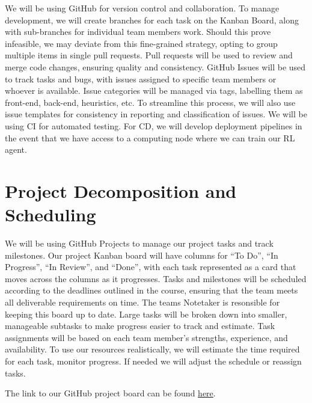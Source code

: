 \documentclass{article}
\begin{document}
\raggedright
We will be using GitHub for version control and collaboration.
To manage development, we will create branches for each task on the Kanban Board,
along with sub-branches for individual team members work.
Should this prove infeasible, we may deviate from this fine-grained strategy, opting to group multiple items in single pull requests.
Pull requests will be used to review and merge code changes, ensuring quality and
consistency. GitHub Issues will be used to track tasks and bugs, with 
issues assigned to specific team members or whoever is available.
Issue categories will be managed via tags, labelling them as front-end, back-end, heuristics, etc.
To streamline this process, we will also use issue templates for 
consistency in reporting and classification of issues.  We will be
using CI for automated testing. For CD, we will develop deployment pipelines in the
event that we have access to a computing node where we can train our RL agent.

\section{Project Decomposition and Scheduling}


\raggedright
We will be using GitHub Projects to manage our project tasks and 
track milestones. Our project Kanban board will have columns for ``To Do'', ``In Progress'', ``In Review'',
and ``Done'', with each task represented as a card that moves across the columns as it progresses. Tasks
and milestones will be scheduled according to the deadlines outlined in the course, ensuring that
the team meets all deliverable requirements on time. The teams Notetaker is resonsible for keeping
this board up to date. Large tasks will be broken down into smaller,
manageable subtasks to make progress easier to track and estimate. Task assignments will be based
on each team member’s strengths, experience, and availability. To use our resources realistically,
we will estimate the time required for each task, monitor progress. If needed we will adjust the
schedule or reassign tasks.

\medskip
The link to our GitHub project board can be found \href{https://github.com/users/SY3141/projects/1}{here}.
\end{document}
